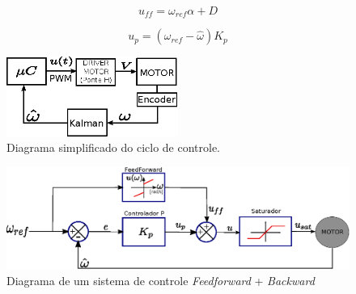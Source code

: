 \begin{equation}
    u_{ff} = \omega_{ref}\alpha + D
    \label{eq:feedforward}
\end{equation}

\begin{equation}
    u_{p} = (\omega_{ref} - \hat{\omega})K_p
    \label{eq:proporcional}
\end{equation}

\begin{figure}[H]
    \centering
    \includegraphics[width=0.5\textwidth]{figuras/ilustracoes/sistema_de_controle_embarcado.eps}
    \caption{Diagrama simplificado do ciclo de controle.}
    \label{fig:diagrama_de_controle_simplificado}
\end{figure}

\begin{figure}[H]
    \centering
    \includegraphics[width=\textwidth]{figuras/ilustracoes/sistema_de_controle_completo.eps}
    \caption{Diagrama de um sistema de controle \textit{Feedforward} + \textit{Backward}}
    \label{fig:diagrama_sistema_de_controle_feedforward_backward}
\end{figure}
